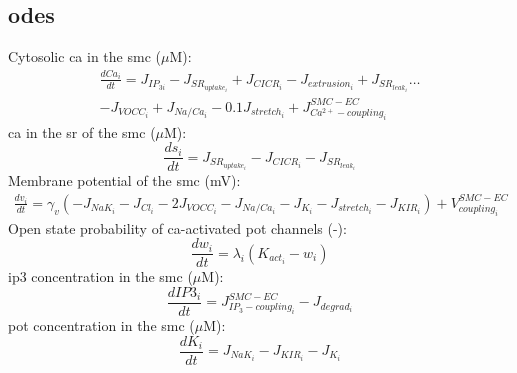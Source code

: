 \documentclass[11pt]{elsarticle}
\newcommand{\uM}{$\mu$M\xspace}
\newcommand{\pot}{\gls{pot}\xspace}
\newcommand{\ca}{\gls{ca}\xspace}
\newcommand{\ip}{\gls{ip3}\xspace}
\begin{document}
\subsection{\Glspl{ode}}
%
Cytosolic \ca in the \gls{smc} (\uM):
\begin{equation}\label{eq:ci}
\begin{split}
\frac{dCa_i}{dt} = J_{IP_{3i}} - J_{SR_{uptake_{i}}} + J_{CICR_{i}} - J_{extrusion_{i}} +  J_{SR_{leak_{i}}}\dots \\
 - J_{VOCC_{i}} + J_{Na/Ca_{i}}  - 0.1J_{stretch_{i}} + J_{Ca^{2+}-coupling_{i}}^{SMC-EC}
\end{split} 
\end{equation}
%
\ca in the \gls{sr} of the \gls{smc} (\uM):
\begin{equation} \label{eq:si}
\frac{ds_i}{dt} =  J_{SR_{uptake_{i}}} - J_{CICR_{i}} - J_{SR_{leak_{i}}}
\end{equation}
%
Membrane potential of the \gls{smc} (mV):
\begin{equation} \label{eq:vi}
\begin{split}
\frac{dv_{i}}{dt} = \gamma_v( -J_{NaK_{i}} - J_{Cl_{i}} - 2J_{VOCC_{i}}- J_{Na/Ca_{i}} - J_{K_{i}}
- J_{stretch_{i}} - J_{KIR_{i}} ) +V^{SMC-EC}_{coupling_{i}}
\end{split}
\end{equation}
%
Open state probability of \ca-activated \pot channels (-):
\begin{equation} \label{eq:dwidt}
\frac{dw_{i}}{dt} =  \lambda_{i} \left( K_{act_{i}} - w_{i} \right)
\end{equation}
%
\ip concentration in the \gls{smc} (\uM):
\begin{equation} \label{eq:dIidt}
\frac{dIP3_i}{dt} = J^{SMC-EC}_{IP_{3}-coupling_{i}} - J_{degrad_{i}}
\end{equation}
%
\pot concentration in the \gls{smc} (\uM):
\begin{equation} \label{eq:dkidt}
\frac{d K_i}{dt}  = J_{NaK_{i}}  - J_{KIR_{i}} - J_{K_{i}}
\end{equation}
%
\end{document}
